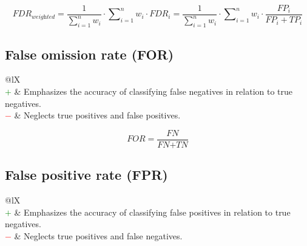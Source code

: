 \documentclass{article}
\begin{document}
\begin{equation}
    \textit{FDR}_\textit{weighted} = \dfrac{1}{\sum\nolimits_{i = 1}^n w_i} \cdot \sum\nolimits_{i = 1}^n w_i \cdot \textit{FDR}_i = \dfrac{1}{\sum\nolimits_{i = 1}^n w_i} \cdot \sum\nolimits_{i = 1}^n w_i \cdot \dfrac{\textit{FP}_i}{\textit{FP}_i + \textit{TP}_i}
%
    \label{equation:WAFDR}
\end{equation}


\subsection[False omission rate (FOR)]{False omission rate (FOR) \cite{zafar2017fairness}}

\begin{table}[H]\centering
    \begin{tabularx}{\textwidth}{@{}lX}
         \\
        \textcolor{Green}{$+$} & Emphasizes the accuracy of classifying false negatives in relation to true negatives. \\
        \textcolor{Red}{$-$}   & Neglects true positives and false positives.
    \end{tabularx}
\end{table}

\begin{equation}
    \textit{FOR} = \dfrac{\textit{FN}}{\textit{FN} + \textit{TN}}
%
    \label{equation:FOR}
\end{equation}


\subsection[False positive rate (FPR)]{False positive rate (FPR) \cite{banerjee2009hypothesis}}

\begin{table}[H]\centering
    \begin{tabularx}{\textwidth}{@{}lX}
         \\
        \textcolor{Green}{$+$} & Emphasizes the accuracy of classifying false positives in relation to true negatives. \\
        \textcolor{Red}{$-$}   & Neglects true positives and false negatives.
    \end{tabularx}
\end{table}
\end{document}
